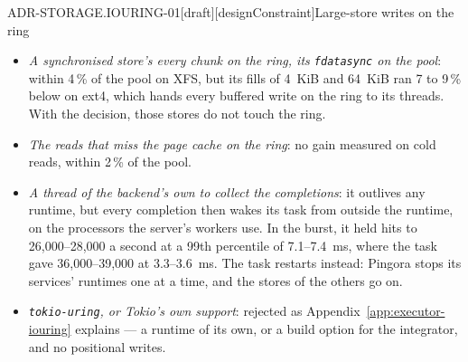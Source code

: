 \begin{requirement}{ADR-STORAGE.IOURING-01}[draft][designConstraint]{Large-store writes on the ring}
\begin{itemize}
      cap raised to 512, XFS came back within 5\,\%, on about 2{,}100
      threads, and ext4 stayed 10 to 16\,\% below.
    \item \emph{A synchronised store's every chunk on the ring, its
      \texttt{fdatasync} on the pool}: within 4\,\% of the pool on XFS,
      but its fills of 4~KiB and 64~KiB ran 7 to 9\,\% below on ext4, which
      hands every buffered write on the ring to its threads. With the
      decision, those stores do not touch the ring.
    \item \emph{The reads that miss the page cache on the ring}: no gain
      measured on cold reads, within 2\,\% of the pool.
    \item \emph{A thread of the backend's own to collect the completions}:
      it outlives any runtime, but every completion then wakes its task from
      outside the runtime, on the processors the server's workers use. In
      the burst, it held hits to 26{,}000--28{,}000 a second at a 99th
      percentile of
      7.1--7.4~ms, where the task gave 36{,}000--39{,}000 at 3.3--3.6~ms. The
      task restarts instead: Pingora stops its services' runtimes one at a
      time, and the stores of the others go on.
    \item \emph{\texttt{tokio-uring}, or Tokio's own support}: rejected as
      Appendix~\ref{app:executor-iouring} explains --- a runtime of its own,
      or a build option for the integrator, and no positional writes.
  \end{itemize}


\end{requirement}
